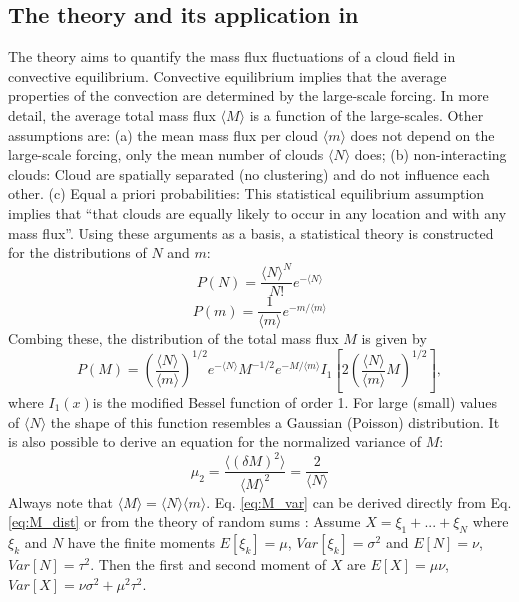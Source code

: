 \documentclass[a4paper, 12pt, draft]{article}
\begin{document}
\subsection{The \cite{Craig2006} theory and its application in \cite{Plant2008}} 
The \cite[][CC06]{Craig2006} theory aims to quantify the mass flux fluctuations of a cloud field in convective equilibrium. Convective equilibrium implies that the average properties of the convection are determined by the large-scale forcing. In more detail, the average total mass flux $\langle M \rangle$ is a function of the large-scales. Other assumptions are: (a) the mean mass flux per cloud $\langle m \rangle$ does not depend on the large-scale forcing, only the mean number of clouds $\langle N \rangle$ does; (b) non-interacting clouds: Cloud are spatially separated (no clustering) and do not influence each other. (c) Equal a priori probabilities: This statistical equilibrium assumption implies that ``that clouds are equally likely to occur in any location and with any mass flux''. Using these arguments as a basis, a statistical theory is constructed for the distributions of $N$ and $m$:
\begin{equation} \label{eq:N_dist}
 P(N) = \frac{\langle N \rangle^N}{N!}e^{-\langle N \rangle}
\end{equation}
\begin{equation} \label{eq:m_dist}
 P(m) = \frac{1}{\langle m \rangle}e^{-m/\langle m \rangle}
\end{equation}
Combing these, the distribution of the total mass flux $M$ is given by
\begin{equation} \label{eq:M_dist}
 P(M) = \left( \frac{\langle N \rangle}{\langle m \rangle} \right)^{1/2} e^{-\langle N \rangle} M^{-1/2} e^{-M/\langle m \rangle} I_1\left[ 2 \left( \frac{\langle N \rangle}{\langle m \rangle} M \right)^{1/2} \right],
\end{equation}
where $I_1(x)$is the modified Bessel function of order 1. For large (small) values of $\langle N \rangle$ the shape of this function resembles a Gaussian (Poisson) distribution.   
It is also possible to derive an equation for the normalized variance of $M$:
\begin{equation} \label{eq:M_var}
 \mu_2 = \frac{\langle (\delta M)^2 \rangle}{\langle M \rangle^2} = \frac{2}{\langle N \rangle}
\end{equation}
Always note that $\langle M \rangle = \langle N \rangle \langle m \rangle$. Eq. \ref{eq:M_var} can be derived directly from Eq. \ref{eq:M_dist} or from the theory of random sums \cite[][p.70ff]{Taylor1998}:
Assume $X=\xi_1 + ... + \xi_N$ where $\xi_k$ and $N$ have the finite moments $E[\xi_k]=\mu$, $Var[\xi_k]=\sigma^2$ and $E[N]=\nu$, $Var[N]=\tau^2$. Then the first and second moment of $X$ are $E[X]=\mu\nu$, $Var[X]=\nu\sigma^2 + \mu^2\tau^2$.
\end{document}
